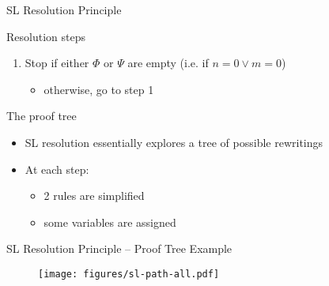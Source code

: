 \documentclass[presentation]{beamer}\mode<presentation>{\usetheme{AMSBolognaFC}}
\begin{document}
\begin{frame}[allowframebreaks]{SL Resolution Principle}
\begin{alertblock}{Resolution steps}
\begin{enumerate}
            \item \alert{Stop} if either $\Phi$ or $\Psi$ are empty (i.e. if \alert{$n = 0 \vee m = 0$})
            \begin{itemize}
                \item \alert{otherwise}, %
                go to step 1
            \end{itemize}

        \end{enumerate}
    \end{alertblock}
    \begin{alertblock}{The proof tree}
        \begin{itemize}
            \item SL resolution essentially explores a \alert{tree} of possible \alert{rewritings}
            \item At each step:
            \begin{itemize}
                \item 2 rules are simplified
                \item some variables are assigned
            \end{itemize}
        \end{itemize}
    \end{alertblock}
\end{frame}

\begin{frame}{SL Resolution Principle -- Proof Tree Example}
    \begin{figure}
        \texttt{[image: figures/sl-path-all.pdf]}
    \end{figure}
\end{frame}
\end{document}
